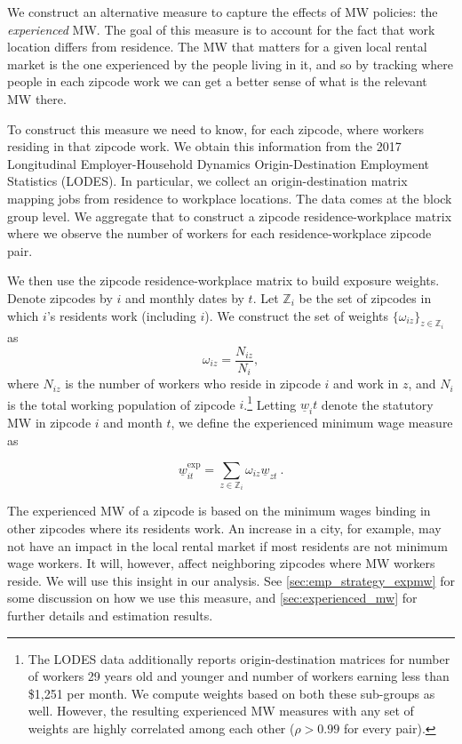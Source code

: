We construct an alternative measure to capture the effects of MW policies: the 
\textit{experienced} MW. The goal of this measure is to account for the fact that work 
location differs from residence. The MW that matters for a given local rental market 
is the one experienced by the people living in it, and so by tracking where people in 
each zipcode work we can get a better sense of what is the relevant MW there.

To construct this measure we need to know, for each zipcode, where workers residing in that 
zipcode work. We obtain this information from the 2017 Longitudinal Employer-Household 
Dynamics Origin-Destination Employment Statistics (LODES). In particular, we collect an 
origin-destination matrix mapping jobs from residence to workplace locations. The data 
comes at the block group level. We aggregate that to construct a zipcode residence-workplace
matrix where we observe the number of workers for each residence-workplace zipcode pair.

We then use the zipcode residence-workplace matrix to build exposure weights. Denote 
zipcodes by $i$ and monthly dates by $t$. Let $\mathds{Z}_i$ be the set of zipcodes in 
which $i$'s residents work (including $i$). We construct the set of weights 
$\{\omega_{iz}\}_{z \in \mathds{Z}_i}$ as $$\omega_{iz} = \frac{N_{iz}}{N_i} , $$ where 
$N_{iz}$ is the number of workers who reside in zipcode $i$ and work in $z$, and $N_i$ 
is the total working population of zipcode $i$.\footnote{The LODES data additionally 
	reports origin-destination matrices for number of workers 29 years old and younger  
	and number of workers earning less than \$1,251 per month. We compute weights based 
	on both these sub-groups as well. However, the resulting experienced MW measures with
	any set of weights are highly correlated among each other ($\rho>0.99$ for every pair).} 
Letting $\underline{w}_it$ denote the statutory MW in zipcode $i$ and month $t$, we 
define the experienced minimum wage measure as

\begin{equation}
	\underline{w}^{\text{exp}}_{it} = 
			\sum_{z \in \mathds{Z}_i} \omega_{iz} \underline{w}_{zt} \ . 
\end{equation}

The experienced MW of a zipcode is based on the minimum wages binding in other zipcodes 
where its residents work. An increase in a city, for example, may not have an impact in 
the local rental market if most residents are not minimum wage workers. It will, however, 
affect neighboring zipcodes where MW workers reside. We will use this insight in our 
analysis. See \autoref{sec:emp_strategy_expmw} for some discussion on how we use this 
measure, and \autoref{sec:experienced_mw} for further details and estimation results.

